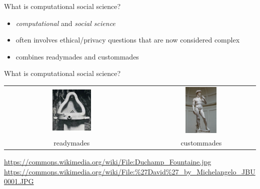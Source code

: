 \documentclass{beamer}
\def\vf{\vfill}
\begin{document}
\begin{frame}{What is computational social science?}

\begin{itemize}
\item \emph{computational} and \emph{social science}
\item often involves ethical/privacy questions that are now considered complex
\item combines readymades and custommades
\end{itemize}

\end{frame}
\begin{frame}{What is computational social science?}

\begin{center}
\begin{tabular}{ccc}
\includegraphics[width=0.30\textwidth]{figures/duchamp_fountain} & \phantom{12345} & {\includegraphics[width=0.30\textwidth]{figures/michelangelo_david}} \\
{\LARGE{readymades}} &  & {\LARGE{custommades}}
\end{tabular}
\end{center}

\vf
{
\tiny{\url{https://commons.wikimedia.org/wiki/File:Duchamp_Fountaine.jpg}}\\
\tiny{\url{https://commons.wikimedia.org/wiki/File:\%27David\%27_by_Michelangelo_JBU0001.JPG}}}

\end{frame}
\end{document}
